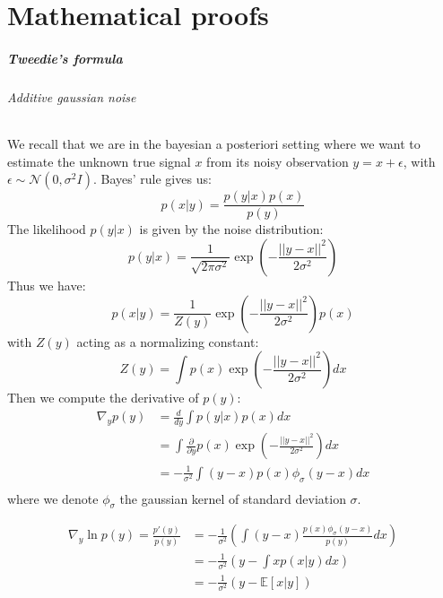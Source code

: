 \chapter{Mathematical proofs}

\paragraph{Tweedie's formula}
\subparagraph{Additive gaussian noise}
We recall that we are in the bayesian a posteriori setting where we want to estimate the unknown true signal $x$ from its noisy observation $y = x + \epsilon$, with $\epsilon \sim \mathcal{N}(0, \sigma^2 I)$.
Bayes' rule gives us:
\begin{equation*}
    p(x|y) = \frac{p(y|x)p(x)}{p(y)}
\end{equation*}
The likelihood $p(y|x)$ is given by the noise distribution:
\begin{equation*}
    p(y|x) = \frac{1}{\sqrt{2 \pi \sigma^2}} \exp\left(-\frac{||y - x||^2}{2 \sigma^2}\right)
\end{equation*}
Thus we have:
\begin{equation*}
    p(x|y) = \frac{1}{Z(y)} \exp\left(-\frac{||y - x||^2}{2 \sigma^2}\right) p(x)
\end{equation*}
with $Z(y)$ acting as a normalizing constant:
\begin{equation*}
    Z(y) = \int p(x) \exp\left(-\frac{||y - x||^2}{2 \sigma^2}\right)dx
\end{equation*}
Then we compute the derivative of $p(y)$:
\begin{align*}
    \nabla_y p(y) &= \frac{d}{dy} \int p(y|x)p(x) dx \\
    &= \int \frac{\partial}{\partial y} p(x) \exp\left(-\frac{||y - x||^2}{2 \sigma^2}\right) dx \\
    &= - \frac{1}{\sigma^2} \int (y - x) p(x) \phi_{\sigma}(y - x) dx \\
\end{align*}
where we denote $\phi_{\sigma}$ the gaussian kernel of standard deviation $\sigma$.

\begin{align*}
    \nabla_y \ln p(y) = \frac{p'(y)}{p(y)} &= - \frac{1}{\sigma^2} \left( \int (y - x) \frac{p(x) \phi_{\sigma}(y - x)}{p(y)} dx \right) \\
    &= - \frac{1}{\sigma^2} \left( y - \int x p(x|y) dx \right) \\
    &= - \frac{1}{\sigma^2} (y - \mathbb{E}[x|y])
\end{align*}

